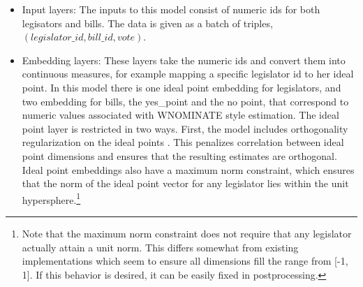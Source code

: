 \documentclass[11pt,]{article}
\begin{document}
\begin{itemize}
\item
  Input layers: The inputs to this model consist of numeric ids for both
  legisators and bills. The data is given as a batch of triples,
  \((legislator\_id, bill\_id, vote)\).
\item
  Embedding layers: These layers take the numeric ids and convert them
  into continuous measures, for example mapping a specific legislator id
  to her ideal point. In this model there is one ideal point embedding
  for legislators, and two embedding for bills, the yes\_point and the
  no point, that correspond to numeric values associated with WNOMINATE
  style estimation. The ideal point layer is restricted in two ways.
  First, the model includes orthogonality regularization on the ideal
  points \citep{orthreg1, orthreg2}. This penalizes correlation between
  ideal point dimensions and ensures that the resulting estimates are
  orthogonal. Ideal point embeddings also have a maximum norm
  constraint, which ensures that the norm of the ideal point vector for
  any legislator lies within the unit hypersphere.\footnote{Note that
    the maximum norm constraint does not require that any legislator
    actually attain a unit norm. This differs somewhat from existing
    implementations which seem to ensure all dimensions fill the range
    from {[}-1, 1{]}. If this behavior is desired, it can be easily
    fixed in postprocessing.}
\end{itemize}
\end{document}
